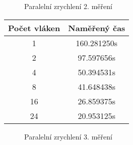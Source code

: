 \documentclass[12pt]{article}
\begin{document}
\begin{figure}[h]
  \begin{center}
    \caption{Paralelní zrychlení 2. měření} 
  \end{center}
\end{figure}




\begin{center}
\begin{tabular}{ c | c }
\textbf{Počet vláken} & \textbf{Naměřený čas} \\ \hline \hline 
1 & 160.281250s \\ \hline
2 & 97.597656s \\ \hline
4 & 50.394531s \\ \hline
8 & 41.648438s \\ \hline
16 & 26.859375s \\ \hline
24 & 20.953125s \\ \hline
\end{tabular}
\end{center}

\begin{figure}[h]
  \begin{center}
    \caption{Paralelní zrychlení 3. měření} 
  \end{center}
\end{figure}
\end{document}
